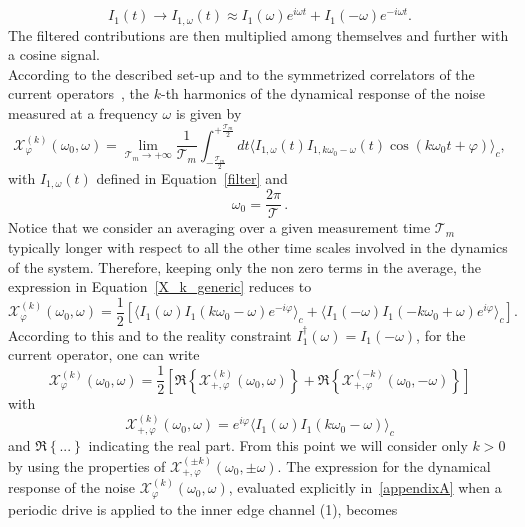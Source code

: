 \documentclass[12pt]{iopart}
\begin{document}
\begin{equation}
    I_{1}(t)\rightarrow I_{1,\omega}(t)\approx I_1(\omega)e^{i\omega t}+I_1(-\omega)e^{-i\omega t}.
    \label{filter}
\end{equation}
The filtered contributions are then multiplied among themselves and further with a cosine signal.\\
According to the described set-up and to the symmetrized correlators of the current operators~\cite{Ferraro18, Gabelli08, Ferraro14b}, the $k$-th harmonics of the dynamical response of the noise measured at a frequency $\omega$ is given by
\begin{equation}
\mathcal{X}^{(k)}_{\varphi}(\omega_{0}, \omega)=\lim_{\mathcal{T}_{m} \rightarrow +\infty}\frac{1}{\mathcal{T}_{m}} \int^{+\frac{\mathcal{T}_{m}}{2}}_{-\frac{\mathcal{T}_{m}}{2}} dt \langle I_{1,\omega}(t) I_{1,k\omega_{0}-\omega}(t) \cos(k \omega_{0}t+\varphi) \rangle_c, 
\label{X_k_generic} 
\end{equation}
with $I_{1,\omega}(t)$ defined in Equation~\eqref{filter} and 
\begin{equation}
\omega_{0}=\frac{2 \pi}{\mathcal{T}}\, .
\end{equation}
Notice that we consider an averaging over a given measurement time $\mathcal{T}_{m}$ typically longer with respect to all the other time scales involved in the dynamics of the system. Therefore, keeping only the non zero terms in the average, the expression in Equation~\eqref{X_k_generic} reduces to
\begin{equation}
    \mathcal{X}^{(k)}_\varphi(\omega_0,\omega)=\frac{1}{2}[\langle I_1(\omega)I_1(k\omega_0 -\omega)e^{-i\varphi}\rangle_c+\langle I_1(-\omega)I_1(-k\omega_0+\omega)e^{i\varphi}\rangle_c].
\end{equation}
According to this and to the reality constraint $I_1^{\dagger}(\omega)=I_1(-\omega)$, for the current operator, one can write 
\begin{equation}
\mathcal{X}^{(k)}_{\varphi}(\omega_{0}, \omega)= \frac{1}{2} \left[\Re\left\{\mathcal{X}^{(k)}_{+, \varphi}(\omega_{0}, \omega)\right\}+\Re\left\{\mathcal{X}^{(-k)}_{+,\varphi}(\omega_{0}, -\omega)\right\}\right] \label{Xp}
\end{equation}
with
\begin{equation}
\mathcal{X}^{(k)}_{+, \varphi}(\omega_{0}, \omega)=e^{i\varphi}\langle I_1(\omega) I_1(k\omega_{0}-\omega) \rangle_{c}
\label{corr}
\end{equation}
and $\Re\left\{...\right\}$ indicating the real part. From this point we will consider only $k>0$ by using the properties of $\mathcal{X}^{(\pm k)}_{+,\varphi}(\omega_0,\pm \omega)$. The expression for the dynamical response of the noise $\mathcal{X}^{(k)}_\varphi(\omega_0,\omega)$, evaluated explicitly in~\ref{appendixA} when a periodic drive is applied to the inner edge channel (1), becomes
\end{document}
